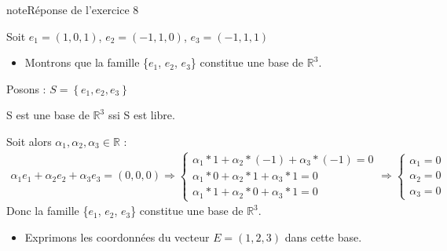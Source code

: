 \documentclass[letterpaper,10pt,french]{jupyterBook}
\begin{document}
\begin{sphinxadmonition}{note}{Réponse de l’exercice 8}

\sphinxAtStartPar
Soit \(e_1 = (1,0,1)\), \(e_2= (-1,1,0)\), \(e_3 = (-1,1,1)\)
\begin{itemize}
\item {} 
\sphinxAtStartPar
Montrons que la famille \{\(e_1\), \(e_2\), \(e_3\)\} constitue une base de \(\mathbb{R}^3\).

\end{itemize}

\sphinxAtStartPar
Posons : \(S= \left\{  e_1, e_2, e_3 \right\}\)

\sphinxAtStartPar
S est une base de \(\mathbb{R}^3\) ssi S est libre.

\sphinxAtStartPar
Soit alors \(\alpha_1, \alpha_2,\alpha_3 \in \mathbb{R}\) :
\begin{equation*}
\begin{split}
\alpha_1 e_1 + \alpha_2 e_2 + \alpha_3 e_3= (0,0,0) \Rightarrow 
    \begin{cases}
      \alpha_1*1 + \alpha_2* (-1) +\alpha_3*(-1)= 0 \\
      \alpha_1*0 + \alpha_2*1 + \alpha_3*1= 0 \\
      \alpha_1*1 + \alpha_2*0 + \alpha_3*1= 0 
      \end{cases}
\Rightarrow        
       \begin{cases}
      \alpha_1 = 0 \\
      \alpha_2 = 0 \\
      \alpha_3 = 0 
      \end{cases}
\end{split}
\end{equation*}
\sphinxAtStartPar
Donc la famille \{\(e_1\), \(e_2\), \(e_3\)\} constitue une base de \(\mathbb{R}^3\).
\begin{itemize}
\item {} 
\sphinxAtStartPar
Exprimons les coordonnées du vecteur \(E = (1,2,3)\) dans cette base.


\end{itemize}
\end{sphinxadmonition}
\end{document}
